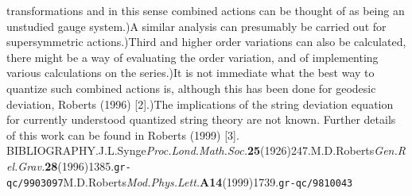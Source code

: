 \documentclass[a4paper,a4paper]{article}
\begin{document}
transformations and in this sense combined actions can be thought of as 
being an unstudied gauge system.)A similar analysis can presumably 
be carried out for supersymmetric actions.)Third and higher order variations can also be calculated,
there might be a way of evaluating the \coordHE{} order variation,
and of implementing various calculations on the series.)It is not immediate what the best way to quantize such combined actions is,
although this has been done for geodesic deviation,  
Roberts (1996) [2].)The implications of the string deviation equation for currently 
understood quantized string theory are not known.\newline
Further details of this work can be found in Roberts (1999) [3].\newline
BIBLIOGRAPHY.\newline
[1]J.L.Synge{\it Proc.Lond.Math.Soc.}{\bf 25}(1926)247.\newline
[2]M.D.Roberts{\it Gen.Rel.Grav.}{\bf 28}(1996)1385.{\tt gr-qc/9903097}\newline
[3]M.D.Roberts{\it Mod.Phys.Lett.}{\bf A14}(1999)1739.{\tt gr-qc/9810043}
\end{document}
